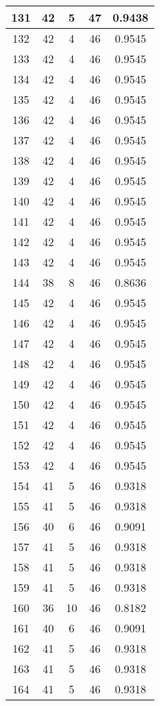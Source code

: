 \documentclass[letterpaper, 12pt]{article}
\begin{document}
\begin{longtable}{|c|c|c|c|c|}
\hline
131 & 42 & 5 & 47 & 0.9438 \\
\hline
132 & 42 & 4 & 46 & 0.9545 \\
\hline
133 & 42 & 4 & 46 & 0.9545 \\
\hline
134 & 42 & 4 & 46 & 0.9545 \\
\hline
135 & 42 & 4 & 46 & 0.9545 \\
\hline
136 & 42 & 4 & 46 & 0.9545 \\
\hline
137 & 42 & 4 & 46 & 0.9545 \\
\hline
138 & 42 & 4 & 46 & 0.9545 \\
\hline
139 & 42 & 4 & 46 & 0.9545 \\
\hline
140 & 42 & 4 & 46 & 0.9545 \\
\hline
141 & 42 & 4 & 46 & 0.9545 \\
\hline
142 & 42 & 4 & 46 & 0.9545 \\
\hline
143 & 42 & 4 & 46 & 0.9545 \\
\hline
144 & 38 & 8 & 46 & 0.8636 \\
\hline
145 & 42 & 4 & 46 & 0.9545 \\
\hline
146 & 42 & 4 & 46 & 0.9545 \\
\hline
147 & 42 & 4 & 46 & 0.9545 \\
\hline
148 & 42 & 4 & 46 & 0.9545 \\
\hline
149 & 42 & 4 & 46 & 0.9545 \\
\hline
150 & 42 & 4 & 46 & 0.9545 \\
\hline
151 & 42 & 4 & 46 & 0.9545 \\
\hline
152 & 42 & 4 & 46 & 0.9545 \\
\hline
153 & 42 & 4 & 46 & 0.9545 \\
\hline
154 & 41 & 5 & 46 & 0.9318 \\
\hline
155 & 41 & 5 & 46 & 0.9318 \\
\hline
156 & 40 & 6 & 46 & 0.9091 \\
\hline
157 & 41 & 5 & 46 & 0.9318 \\
\hline
158 & 41 & 5 & 46 & 0.9318 \\
\hline
159 & 41 & 5 & 46 & 0.9318 \\
\hline
160 & 36 & 10 & 46 & 0.8182 \\
\hline
161 & 40 & 6 & 46 & 0.9091 \\
\hline
162 & 41 & 5 & 46 & 0.9318 \\
\hline
163 & 41 & 5 & 46 & 0.9318 \\
\hline
164 & 41 & 5 & 46 & 0.9318 \\

\end{longtable}
\end{document}
